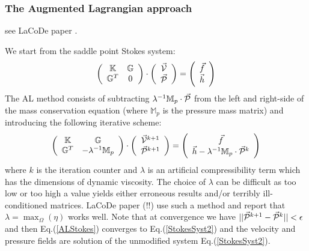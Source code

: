 \subsubsection{The Augmented Lagrangian approach}

see LaCoDe paper \cite{demh19}.

We start from the saddle point Stokes system:
\begin{equation}
\left(
\begin{array}{cc}
{\mathbb{K}} & {\mathbb{G}} \\ {\mathbb{G}}^T & 0 
\end{array}
\right)
\cdot
\left(
\begin{array}{c}
\vec{\cal V} \\ \vec{\cal P}
\end{array}
\right)
=
\left(
\begin{array}{c}
\vec{f} \\ \vec{h}
\end{array}
\right)
\label{StokesSyst2}
\end{equation}
The AL method consists of subtracting $\lambda^{-1} \mathbb{M}_p \cdot \vec{\cal P}$ from the left and 
right-side of the mass conservation equation (where $\mathbb{M}_p$ is the pressure mass matrix) 
and introducing the following iterative scheme:
\begin{equation}
\left(
\begin{array}{cc}
{\mathbb{K}} & {\mathbb{G}} \\ {\mathbb{G}}^T & -\lambda^{-1} \mathbb{M}_p
\end{array}
\right)
\cdot
\left(
\begin{array}{c}
\vec{\cal V}^{k+1} \\ \vec{\cal P}^{k+1}
\end{array}
\right)
=
\left(
\begin{array}{c}
\vec{f} \\ \vec{h} - \lambda^{-1} \mathbb{M}_p \cdot \vec{\cal P}^k
\end{array}
\right)
\label{ALStokes}
\end{equation}
where $k$ is the iteration counter and $\lambda$ is an artificial compressibility term which has 
the dimensions of dynamic viscosity. 
The choice of $\lambda$ can be difficult as too low or too high a value yields either erroneous results and/or terribly ill-conditioned matrices. LaCoDe paper (!!) use such a method and report that $\lambda=\max_\Omega({\eta})$
works well. 
Note that at convergence we have $||\vec{\cal P}^{k+1}-\vec{\cal P}^k||<\epsilon$ and then Eq.(\ref{ALStokes}) converges to Eq.(\ref{StokesSyst2}) and the velocity and pressure fields are solution of the unmodified system Eq.(\ref{StokesSyst2}).

